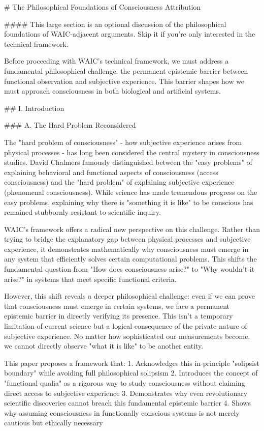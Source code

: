 # The Philosophical Foundations of Consciousness Attribution

#### This large section is an optional discussion of the philosophical foundations of WAIC-adjacent arguments. Skip it if you're only interested in the technical framework.

Before proceeding with WAIC's technical framework, we must address a fundamental philosophical challenge: the permanent epistemic barrier between functional observation and subjective experience. This barrier shapes how we must approach consciousness in both biological and artificial systems.

## I. Introduction

### A. The Hard Problem Reconsidered

The "hard problem of consciousness" - how subjective experience arises from physical processes - has long been considered the central mystery in consciousness studies. David Chalmers famously distinguished between the "easy problems" of explaining behavioral and functional aspects of consciousness (access consciousness) and the "hard problem" of explaining subjective experience (phenomenal consciousness). While science has made tremendous progress on the easy problems, explaining why there is "something it is like" to be conscious has remained stubbornly resistant to scientific inquiry.

WAIC's framework offers a radical new perspective on this challenge. Rather than trying to bridge the explanatory gap between physical processes and subjective experience, it demonstrates mathematically why consciousness must emerge in any system that efficiently solves certain computational problems. This shifts the fundamental question from "How does consciousness arise?" to "Why wouldn't it arise?" in systems that meet specific functional criteria.

However, this shift reveals a deeper philosophical challenge: even if we can prove that consciousness must emerge in certain systems, we face a permanent epistemic barrier in directly verifying its presence. This isn't a temporary limitation of current science but a logical consequence of the private nature of subjective experience. No matter how sophisticated our measurements become, we cannot directly observe "what it is like" to be another entity.

This paper proposes a framework that:
1. Acknowledges this in-principle "solipsist boundary" while avoiding full philosophical solipsism
2. Introduces the concept of "functional qualia" as a rigorous way to study consciousness without claiming direct access to subjective experience
3. Demonstrates why even revolutionary scientific discoveries cannot breach this fundamental epistemic barrier
4. Shows why assuming consciousness in functionally conscious systems is not merely cautious but ethically necessary

